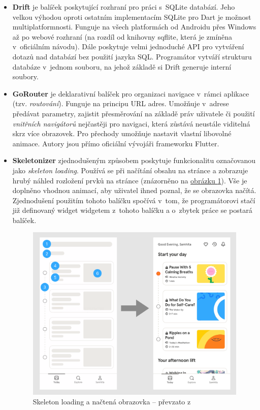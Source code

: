 \documentclass[
  biblatex,
  figures=true,
  tables=false,
  glossaries,
  index
]{kidiplom}
\begin{document}
\begin{itemize}
  \item \textbf{Drift} \cite{drift} je balíček poskytující rozhraní pro práci s~SQLite databází. Jeho velkou výhodou oproti ostatním implementacím SQLite pro Dart je možnost multiplatformnosti. Funguje na všech platformách od Androidu přes Windows až po webové rozhraní (na rozdíl od knihovny sqflite, která je zmíněna v~oficiálním návodu). Dále poskytuje velmi jednoduché API pro vytváření dotazů nad databází bez použití jazyka SQL. Programátor vytváří strukturu databáze v~jednom souboru, na jehož základě si Drift generuje interní soubory.
  \item \textbf{GoRouter} \cite{gorouter} je deklarativní balíček pro organizaci navigace v~rámci aplikace (tzv. \textit{routování}). Funguje na principu URL adres. Umožňuje v~adrese předávat parametry, zajistit přesměrování na základě práv uživatele či použití \textit{vnitřních navigátorů} nejčastěji pro navigaci, která zůstává neustále viditelná skrz více obrazovek. Pro přechody umožňuje nastavit vlastní libovolné animace. Autory jsou přímo oficiální vývojáři frameworku Flutter.
  \item \textbf{Skeletonizer} \cite{skeletonizer} zjednodušeným způsobem poskytuje funkcionalitu označovanou jako \textit{skeleton loading}. Používá se při načítání obsahu na stránce a zobrazuje hrubý náhled rozložení prvků na stránce (znázorněno  na \hyperref[fig:skeleton]{obrázku \ref{fig:skeleton}}). Vše je doplněno vhodnou animací, aby uživatel ihned poznal, že se obrazovka načítá. Zjednodušení použitím tohoto balíčku spočívá v~tom, že programátorovi stačí již definovaný widget  widgetem  z~tohoto balíčku a o~zbytek práce se postará balíček.
  
  \begin{figure}
  	\centering
  	\includegraphics[scale=0.1]{images/skeletonizer.png}
  	\caption{Skeleton loading a načtená obrazovka -- převzato z~\cite{skeleton}}
    \label{fig:skeleton}
  \end{figure}
  

\end{itemize}
\end{document}
